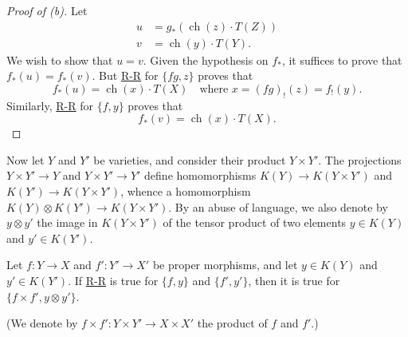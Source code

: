 \documentclass{article}
\theoremstyle{plain}
\newenvironment{lemma}[1]
    {\renewcommand\theinnercustomlemma{#1}\innercustomlemma}
    {\endinnercustomlemma}
\theoremstyle{definition}
\DeclareMathOperator{\ch}{ch}
\begin{document}
\begin{proof}[Proof of (b)]
  Let
  \begin{align*}
    u &= g_*(\ch(z)\cdot T(Z))
  \\v &= \ch(y)\cdot T(Y).
  \end{align*}
  We wish to show that $u=v$.
  Given the hypothesis on $f_*$, it suffices to prove that $f_*(u)=f_*(v)$.
  But \hyperref[theoremriemannroch]{R-R} for $\{fg,z\}$ proves that
  \[
    f_*(u) = \ch(x)\cdot T(X)
    \quad
    \mbox{where $x=(fg)_!(z)=f_!(y)$.}
  \]
  Similarly, \hyperref[theoremriemannroch]{R-R} for $\{f,y\}$ proves that
  \[
    f_*(v) = \ch(x)\cdot T(X).
  \]
\end{proof}

Now let $Y$ and $Y'$ be varieties, and consider their product $Y\times Y'$.
The projections $Y\times Y'\to Y$ and $Y\times Y'\to Y'$ define homomorphisms $K(Y)\to K(Y\times Y')$ and $K(Y')\to K(Y\times Y')$, whence a homomorphism $K(Y)\otimes K(Y')\to K(Y\times Y')$.
By an abuse of language, we also denote by $y\otimes y'$ the image in $K(Y\times Y')$ of the tensor product of two elements $y\in K(Y)$ and $y'\in K(Y')$.

\begin{lemma}{16}
\label{lemma16}
  Let $f\colon Y\to X$ and $f'\colon Y'\to X'$ be proper morphisms, and let $y\in K(Y)$ and $y'\in K(Y')$.
  If \hyperref[theoremriemannroch]{R-R} is true for $\{f,y\}$ and $\{f',y'\}$, then it is true for $\{f\times f',y\otimes y'\}$.
\end{lemma}

(We denote by $f\times f'\colon Y\times Y'\to X\times X'$ the product of $f$ and $f'$.)
\end{document}
